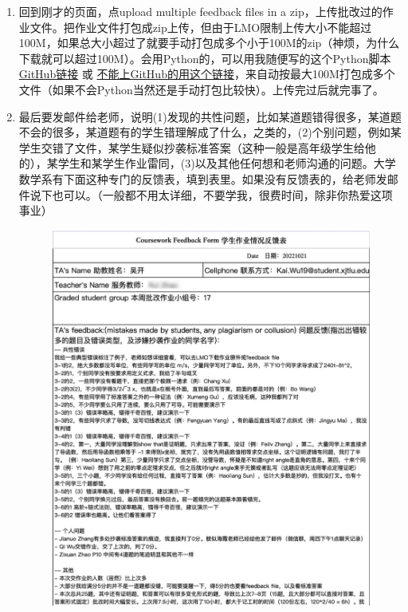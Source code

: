 \begin{enumerate}
\begin{figure}[H]
        \end{figure}
    \item 回到刚才的页面，点upload multiple feedback files in a zip，上传批改过的作业文件。把作业文件打包成zip上传，但由于LMO限制上传大小不能超过100M，如果总大小超过了就要手动打包成多个小于100M的zip（神烦，为什么下载就可以超过100M）。会用Python的，可以用我随便写的这个Python脚本 \href{https://github.com/kaiwu-astro/xp_pgrs_unofficial_guide/tree/main/fileshare/zip_in_100M.py}{GitHub链接} 或 \href{https://cowtransfer.com/s/8a91e9aa59ad4a}{不能上GitHub的用这个链接}，来自动按最大100M打包成多个文件（如果不会Python当然还是手动打包比较快）。上传完过后就完事了。
    \item 最后要发邮件给老师，说明(1)发现的共性问题，比如某道题错得很多，某道题不会的很多，某道题有的学生错理解成了什么，之类的，(2)个别问题，例如某学生交错了文件，某学生疑似抄袭标准答案（这种一般是高年级学生给他的），某学生和某学生作业雷同，(3)以及其他任何想和老师沟通的问题。大学数学系有下面这种专门的反馈表，填到表里。如果没有反馈表的，给老师发邮件说下也可以。（一般都不用太详细，不要学我，很费时间，除非你热爱这项事业）
        \begin{figure}[H]
            \centering
            \includegraphics[width=0.5\columnwidth]{author-folder/Kai.Wu/LMO_feedback_to_teacher.jpg}
        \end{figure}
\end{enumerate}


